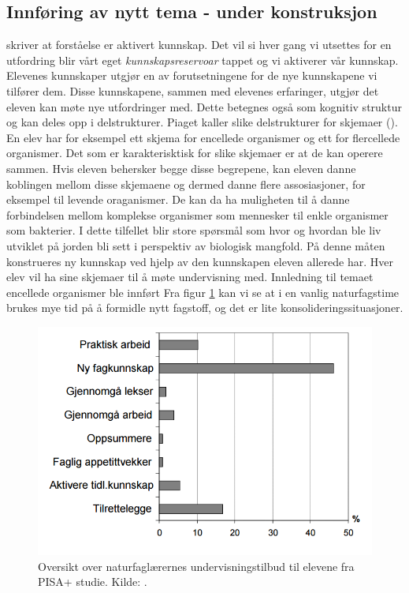 \documentclass[main.tex]{subfiles}
\begin{document}
\subsection*{Innføring av nytt tema - under konstruksjon}
 skriver at forståelse er aktivert kunnskap. Det vil si hver gang vi utsettes 
for en utfordring blir vårt eget \emph{kunnskapsreservoar} tappet og vi aktiverer vår kunnskap. 
Elevenes kunnskaper utgjør en av forutsetningene for de nye kunnskapene vi tilfører dem. Disse 
kunnskapene, sammen med elevenes erfaringer, utgjør det eleven kan møte nye utfordringer med. Dette 
betegnes også som kognitiv struktur og kan deles opp i delstrukturer. Piaget 
kaller slike delstrukturer for skjemaer (). En elev har for eksempel ett skjema 
for encellede organismer og ett for flercellede organismer. Det som er karakterisktisk for slike 
skjemaer er at de kan operere sammen. Hvis eleven behersker begge disse begrepene, kan eleven danne 
koblingen mellom disse skjemaene og dermed danne flere assosiasjoner, for eksempel til levende oraganismer. 
De kan da ha muligheten til å danne forbindelsen mellom komplekse organismer som mennesker til enkle 
organismer som bakterier. I dette tilfellet blir store spørsmål som hvor og hvordan ble liv utviklet 
på jorden bli sett i perspektiv av biologisk mangfold. På denne måten konstrueres ny kunnskap ved hjelp 
av den kunnskapen eleven allerede har.
\newline
\newline
Hver elev vil ha sine skjemaer til å møte undervisning med. Innledning til temaet encellede organismer ble innført
\newline
\newline
Fra figur \ref{fig:odeg10} kan vi se at i en vanlig naturfagstime brukes mye tid på å formidle 
nytt fagstoff, og det er lite konsolideringssituasjoner. 


\begin{figure}[h!]
\includegraphics[scale = 0.6]{../figures/undervisnings_aktivitet.png}
\caption{Oversikt over naturfaglærernes undervisningstilbud til elevene fra PISA+ studie. Kilde: 
\protect{}.}
\label{fig:odeg10}
\end{figure}
\end{document}
